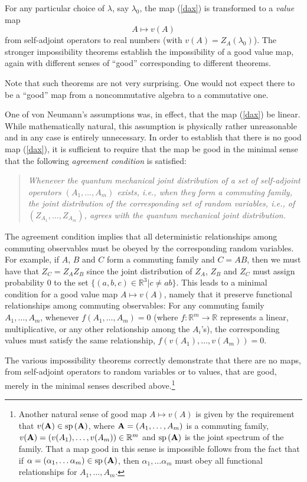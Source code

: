 \documentclass[12pt]{article}
\newcommand{\eq}[1]{(\ref{#1})}
\newcommand{\sa}{self-adjoint}
\renewcommand{\a}{\alpha}
\newcommand{\lam}{\lambda}
\newcommand{\R}{\mathbb{R}}
\newcommand{\rv}{Z}
\begin{document}
For any particular choice of $\lam$, say $\lam_0$, the map \eq{dax} is
transformed to a \emph{value} map
\begin{equation}\label{dax2} A\mapsto v(A)
\end{equation}
{}from \sa{} operators to real numbers (with $v(A)= {\rv}_A(\lam_0)$).
The stronger impossibility theorems establish the impossibility of a
good value map, again with different senses of ``good'' corresponding
to different theorems.

Note that such theorems are not very surprising. One would not expect
there to be a ``good'' map {}from a noncommutative algebra to a
commutative one.



One of von Neumann's assumptions was, in effect, that the map \eq{dax}
be linear. While mathematically natural, this assumption is physically
rather unreasonable and in any case is entirely unnecessary. In order
to establish that there is no good map \eq{dax}, it is sufficient to
require that the map be good in the minimal sense that the following
{\it agreement condition} is satisfied:
\begin{quotation}\small{\it
     Whenever the quantum mechanical joint distribution of a set of
     \sa{} operators $(A_1,\ldots, A_m)$ exists, i.e., when they form a
     commuting family, the joint distribution of the corresponding set
     of random variables, i.e., of $(\rv_{A_1}, \ldots, \rv_{A_m})$,
     agrees with the quantum mechanical joint
     distribution.}\end{quotation}


The agreement condition implies that all deterministic relationships
among commuting observables must be obeyed by the corresponding random
variables. For example, if $A$, $B$ and $C$ form a commuting family
and $C=AB$, then we must have that $\rv_C =\rv_A\rv_B$ since the joint
distribution of $\rv_A$, $\rv_B$ and $\rv_C$ must assign probability
$0$ to the set $\{(a,b,c)\in \R^3 | c\neq ab\}$.  This leads to a
minimal condition for a good value map $A\mapsto v(A)$, namely that it
preserve functional relationships among commuting observables: For any
commuting family $A_1,\ldots, A_m$, whenever $f(A_1, \dots, A_m)=0$
(where $f:\R^m\to\R$ represents a linear, multiplicative, or any other
relationship among the $A_i$'s), the corresponding values must satisfy
the same relationship, $f(v(A_1),\ldots, v(A_m))=0 $.

The various impossibility theorems correctly demonstrate that there
are no maps, {}from self-adjoint operators to random variables or to
values, that are good, merely in the minimal senses described
above.\footnote{Another natural sense of good map $A\mapsto v(A)$ is
   given by the requirement that $v({\bf A})\in \mbox{sp}\,({\bf A})$,
   where ${\bf A}=(A_1,\ldots, A_m)$ is a commuting family, $v({\bf
     A})= (v(A_1),\ldots, v(A_m))\in \R^m$ and $\mbox{sp}\,({\bf A})$
   is the joint spectrum of the family.  That a map good in this sense
   is impossible follows {}from the fact that if ${\bf
     \a}=(\a_1,\ldots\a_m)\in \mbox{sp}\,({\bf A})$, then
   $\a_1,\ldots\a_m $ must obey all functional relationships for
   $A_1,\ldots, A_m $.}  \bigskip
\end{document}
